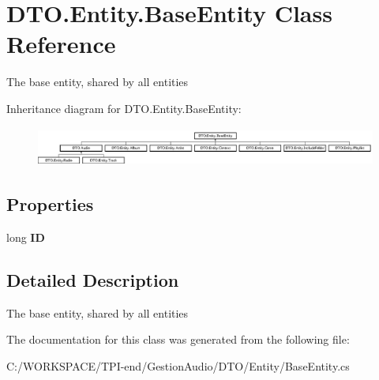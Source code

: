 \hypertarget{class_d_t_o_1_1_entity_1_1_base_entity}{}\section{D\+T\+O.\+Entity.\+Base\+Entity Class Reference}
\label{class_d_t_o_1_1_entity_1_1_base_entity}


The base entity, shared by all entities  


Inheritance diagram for D\+T\+O.\+Entity.\+Base\+Entity\+:\begin{figure}[H]
\begin{center}
\leavevmode
\includegraphics[height=1.288344cm]{class_d_t_o_1_1_entity_1_1_base_entity}
\end{center}
\end{figure}
\subsection*{Properties}
\begin{DoxyCompactItemize}
\item 
\mbox{\label{class_d_t_o_1_1_entity_1_1_base_entity_a1186e3cdf350f3d532425c67d786e889}} 
long {\bfseries ID}
\end{DoxyCompactItemize}


\subsection{Detailed Description}
The base entity, shared by all entities 



The documentation for this class was generated from the following file\+:\begin{DoxyCompactItemize}
\item 
C\+:/\+W\+O\+R\+K\+S\+P\+A\+C\+E/\+T\+P\+I-\/end/\+Gestion\+Audio/\+D\+T\+O/\+Entity/Base\+Entity.\+cs\end{DoxyCompactItemize}
